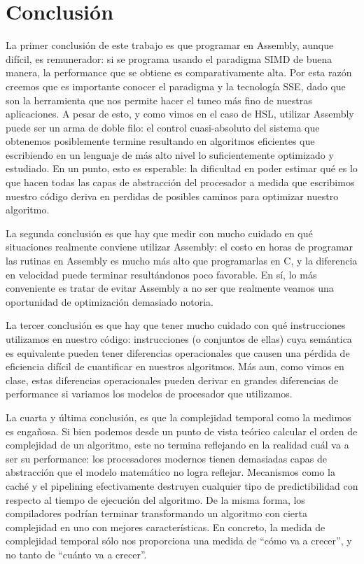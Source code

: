 \section{Conclusión}

La primer conclusión de este trabajo es que programar en Assembly, aunque difícil, es remunerador: si se programa usando el paradigma SIMD de buena manera, la performance que se obtiene es comparativamente alta. Por esta razón creemos que es importante conocer el paradigma y la tecnología SSE, dado que son la herramienta que nos permite hacer el tuneo más fino de nuestras aplicaciones. A pesar de esto, y como vimos en el caso de HSL, utilizar Assembly puede ser un arma de doble filo: el control cuasi-absoluto del sistema que obtenemos posiblemente termine resultando en algoritmos eficientes que escribiendo en un lenguaje de más alto nivel lo suficientemente optimizado y estudiado. En un punto, esto es esperable: la dificultad en poder estimar qué es lo que hacen todas las capas de abstracción del procesador a medida que escribimos nuestro código deriva en perdidas de posibles caminos para optimizar nuestro algoritmo.

La segunda conclusión es que hay que medir con mucho cuidado en qué situaciones realmente conviene utilizar Assembly: el costo en horas de programar las rutinas en Assembly es mucho más alto que programarlas en C, y la diferencia en velocidad puede terminar resultándonos poco favorable. En sí, lo más conveniente es tratar de evitar Assembly a no ser que realmente veamos una oportunidad de optimización demasiado notoria.

La tercer conclusión es que hay que tener mucho cuidado con qué instrucciones utilizamos en nuestro código: instrucciones (o conjuntos de ellas) cuya semántica es equivalente pueden tener diferencias operacionales que causen una pérdida de eficiencia difícil de cuantificar en nuestros algoritmos. Más aun, como vimos en clase, estas diferencias operacionales pueden derivar en grandes diferencias de performance si variamos los modelos de procesador que utilizamos.

La cuarta  y última conclusión, es que la complejidad temporal como la medimos es engañosa.
Si bien podemos desde un punto de vista teórico calcular el orden de complejidad de un algoritmo, este no termina reflejando en la realidad cuál va a ser su performance: los procesadores modernos tienen demasiadas capas de abstracción que el modelo matemático no logra reflejar.
Mecanismos como la caché y el pipelining efectivamente destruyen cualquier tipo de predictibilidad con respecto al tiempo de ejecución del algoritmo.
De la misma forma, los compiladores podrían terminar transformando un algoritmo con cierta complejidad en uno con mejores características. En concreto, la medida de complejidad temporal sólo nos proporciona una medida de ``cómo va a crecer'', y no tanto de ``cuánto va a crecer''. 



